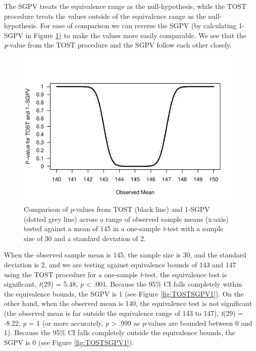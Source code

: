 \documentclass[floatsintext,man]{apa6}
\theoremstyle{definition}
\theoremstyle{definition}
\theoremstyle{definition}
\theoremstyle{remark}
\begin{document}
The SGPV treats the equivalence range as the null-hypothesis, while the
TOST procedure treats the values outside of the equivalence range as the
null-hypothesis. For ease of comparison we can reverse the SGPV (by
calculating 1-SGPV in Figure \ref{fig:TOSTSGPV2}) to make the values
more easily comparable. We see that the \emph{p}-value from the TOST
procedure and the SGPV follow each other closely.

\begin{figure}
\centering
\includegraphics{manuscript_files/figure-latex/TOSTSGPV2-1.pdf}
\caption{\label{fig:TOSTSGPV2}Comparison of \emph{p}-values from TOST (black
line) and 1-SGPV (dotted grey line) across a range of observed sample
means (x-axis) tested against a mean of 145 in a one-sample
\emph{t}-test with a sample size of 30 and a standard deviation of 2.}
\end{figure}

When the observed sample mean is 145, the sample size is 30, and the
standard deviation is 2, and we are testing against equivalence bounds
of 143 and 147 using the TOST procedure for a one-sample \emph{t}-test,
the equivalence test is significant, \emph{t}(29) = 5.48, \emph{p}
\textless{} .001. Because the 95\% CI falls completely within the
equivalence bounds, the SGPV is 1 (see Figure \ref{fig:TOSTSGPV1}). On
the other hand, when the observed mean is 140, the equivalence test is
not significant (the observed mean is far outside the equivalence range
of 143 to 147), \emph{t}(29) = -8.22, \emph{p} = 1 (or more accurately,
\emph{p} \textgreater{} .999 as \emph{p}-values are bounded between 0
and 1). Because the 95\% CI falls completely outside the equivalence
bounds, the SGPV is 0 (see Figure \ref{fig:TOSTSGPV1}).
\end{document}
